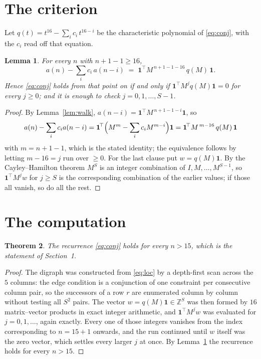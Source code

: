 \documentclass[11pt,a4paper]{article}
\theoremstyle{plain}
\newtheorem{theorem}{Theorem}
\newtheorem{lemma}[theorem]{Lemma}
\theoremstyle{definition}
\begin{document}
\section{The criterion}

Let $q(t)=t^{16}-\sum_i c_i\,t^{16-i}$ be the characteristic polynomial of
\eqref{eq:conj}, with the $c_i$ read off that equation.

\begin{lemma}\label{lem:crit}
For every $n$ with $n+1-1\ge16$,
\[
a(n)-\sum_i c_i\,a(n-i)\;=\;\mathbf{1}^{\!\top}M^{\,n+1-1-16}\,q(M)\,\mathbf{1} .
\]
Hence \eqref{eq:conj} holds from that point on if and only if
$\mathbf{1}^{\!\top}M^{j}q(M)\mathbf{1}=0$ for every $j\ge0$; and it is enough to check
$j=0,1,\dots,S-1$.
\end{lemma}

\begin{proof}
By Lemma~\ref{lem:walk}, $a(n-i)=\mathbf{1}^{\!\top}M^{\,n+1-1-i}\mathbf{1}$, so
\[
a(n)-\sum_i c_i a(n-i)
=\mathbf{1}^{\!\top}\Bigl(M^{m}-\sum_i c_i M^{m-i}\Bigr)\mathbf{1}
=\mathbf{1}^{\!\top}M^{\,m-16}\,q(M)\,\mathbf{1}
\]
with $m=n+1-1$, which is the stated identity; the equivalence follows by letting
$m-16=j$ run over $\ge0$. For the last clause put $w=q(M)\mathbf{1}$. By the
Cayley--Hamilton theorem $M^{S}$ is an integer combination of $I,M,\dots,M^{S-1}$, so
$\mathbf{1}^{\!\top}M^{j}w$ for $j\ge S$ is the corresponding combination of the earlier
values; if those all vanish, so do all the rest.
\end{proof}

\section{The computation}

\begin{theorem}
The recurrence \eqref{eq:conj} holds for every $n>15$, which is the statement of
Section~1.
\end{theorem}

\begin{proof}
The digraph was constructed from \eqref{eq:loc} by a depth-first scan across the $5$
columns: the edge condition is a conjunction of one constraint per consecutive column
pair, so the successors of a row $r$ are enumerated column by column without testing all
$S^2$ pairs. The vector $w=q(M)\mathbf{1}\in\mathbb{Z}^{S}$ was then formed by $16$
matrix--vector products in exact integer arithmetic, and $\mathbf{1}^{\!\top}M^{j}w$ was
evaluated for $j=0,1,\dots$, again exactly. Every one of those integers vanishes from the
index corresponding to $n=15+1$ onwards, and the run continued until $w$ itself was the
zero vector, which settles every larger $j$ at once. By Lemma~\ref{lem:crit} the recurrence
holds for every $n>15$.
\end{proof}
\end{document}
